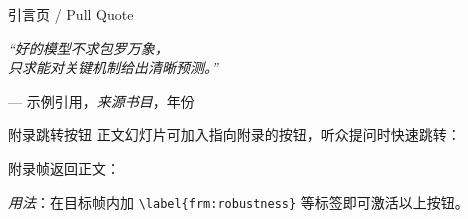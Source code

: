 \begin{frame}{引言页 / Pull Quote}
  \vspace*{\fill}
  \begin{center}
    \Large\itshape
    ``好的模型不求包罗万象，\\
    只求能对关键机制给出清晰预测。''
    \vspace{0.9em}

    \normalsize\upshape
    --- 示例引用，\textit{来源书目}，年份
  \end{center}
  \vspace*{\fill}
\end{frame}

\begin{frame}{附录跳转按钮}
  正文幻灯片可加入指向附录的按钮，听众提问时快速跳转：

  \medskip
  \hyperlink{frm:robustness}{}
  \hspace{1em}
  \hyperlink{frm:derivation}{}
  \hspace{1em}
  \hyperlink{frm:data}{}

  \bigskip
  附录帧返回正文：

  \medskip
  \hyperlink{frm:main-results}{}
  \hspace{1em}
  \hyperlink{frm:empirics}{}

  \bigskip
  {\footnotesize \textit{用法}：在目标帧内加
    \texttt{\textbackslash label\{frm:robustness\}} 等标签即可激活以上按钮。}
\end{frame}
